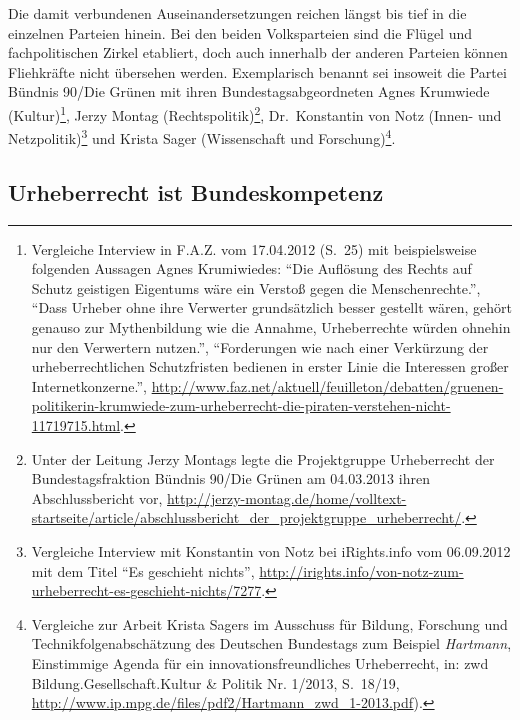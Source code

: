\documentclass[output=paper]{langscibook}
\begin{document}
Die damit verbundenen Auseinandersetzungen reichen längst bis tief in
die einzelnen Parteien hinein. Bei den beiden Volksparteien sind die
Flügel und fachpolitischen Zirkel etabliert, doch auch innerhalb der
anderen Parteien können Fliehkräfte nicht übersehen werden. Exemplarisch
benannt sei insoweit die Partei Bündnis 90/Die Grünen mit ihren
Bundestagsabgeordneten Agnes Krumwiede (Kultur)\footnote{Vergleiche Interview
  in F.A.Z. vom 17.04.2012 (S.~25) mit beispielsweise folgenden Aussagen
  Agnes Krumiwiedes: \enquote{Die Auflösung des Rechts auf Schutz
  geistigen Eigentums wäre ein Verstoß gegen die Menschenrechte.},
  \enquote{Dass Urheber ohne ihre Verwerter grundsätzlich besser
  gestellt wären, gehört genauso zur Mythenbildung wie die Annahme,
  Urheberrechte würden ohnehin nur den Verwertern nutzen.},
  \enquote{Forderungen wie nach einer Verkürzung der urheberrechtlichen
  Schutzfristen bedienen in erster Linie die Interessen großer
  Internetkonzerne.},
  \url{http://www.faz.net/aktuell/feuilleton/debatten/gruenen-politikerin-krumwiede-zum-urheberrecht-die-piraten-verstehen-nicht-11719715.html}.},
Jerzy Montag (Rechtspolitik)\footnote{Unter der Leitung Jerzy Montags
  legte die Projektgruppe Urheberrecht der Bundestagsfraktion Bündnis
  90/Die Grünen am 04.03.2013 ihren Abschlussbericht vor,
  \url{http://jerzy-montag.de/home/volltext-startseite/article/abschlussbericht_der_projektgruppe_urheberrecht/}.},
Dr.~Konstantin von Notz (Innen- und Netzpolitik)\footnote{Vergleiche Interview
  mit Konstantin von Notz bei iRights.info vom 06.09.2012 mit dem Titel
  \enquote{Es geschieht nichts},
  \url{http://irights.info/von-notz-zum-urheberrecht-es-geschieht-nichts/7277}.}
und Krista Sager (Wissenschaft und Forschung)\footnote{Vergleiche zur Arbeit
  Krista Sagers im Ausschuss für Bildung, Forschung und
  Technikfolgenabschätzung des Deutschen Bundestags zum Beispiel
  \emph{Hartmann}, Einstimmige Agenda für ein innovationsfreundliches
  Urheberrecht, in: zwd Bildung.Gesellschaft.Kultur \& Politik Nr.
  1/2013, S.~18/19,
  \url{http://www.ip.mpg.de/files/pdf2/Hartmann_zwd_1-2013.pdf}).}.

\hypertarget{urheberrecht-ist-bundeskompetenz}{%
\subsection{Urheberrecht ist
Bundeskompetenz}\label{urheberrecht-ist-bundeskompetenz}}
\end{document}
